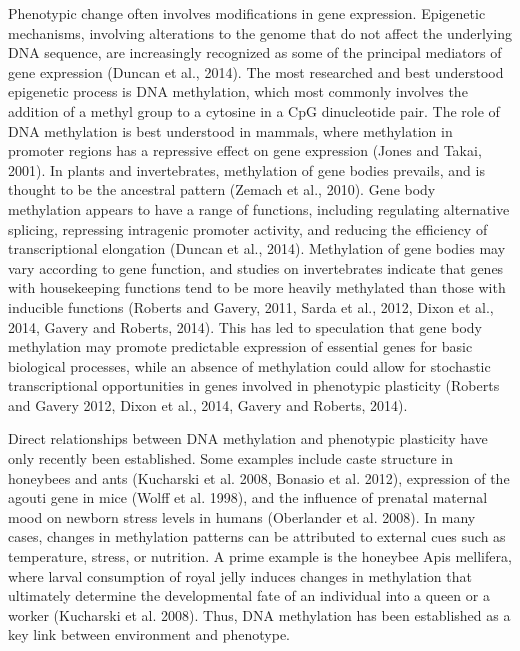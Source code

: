 Phenotypic change often involves modifications in gene expression. Epigenetic mechanisms, involving alterations to the genome that do not affect the underlying DNA sequence, are increasingly recognized as some of the principal mediators of gene expression (Duncan et al., 2014). The most researched and best understood epigenetic process is DNA methylation, which most commonly involves the addition of a methyl group to a cytosine in a CpG dinucleotide pair. The role of DNA methylation is best understood in mammals, where methylation in promoter regions has a repressive effect on gene expression (Jones and Takai, 2001). In plants and invertebrates, methylation of gene bodies prevails, and is thought to be the ancestral pattern (Zemach et al., 2010). Gene body methylation appears to have a range of functions, including regulating alternative splicing, repressing intragenic promoter activity, and reducing the efficiency of transcriptional elongation (Duncan et al., 2014). Methylation of gene bodies may vary according to gene function, and studies on invertebrates indicate that genes with housekeeping functions tend to be more heavily methylated than those with inducible functions (Roberts and Gavery, 2011, Sarda et al., 2012, Dixon et al., 2014, Gavery and Roberts, 2014). This has led to speculation that gene body methylation may promote predictable expression of essential genes for basic biological processes, while an absence of methylation could allow for stochastic transcriptional opportunities in genes involved in phenotypic plasticity (Roberts and Gavery 2012, Dixon et al., 2014, Gavery and Roberts, 2014).
 
Direct relationships between DNA methylation and phenotypic plasticity have only recently been established. Some examples include caste structure in honeybees and ants (Kucharski et al. 2008, Bonasio et al. 2012), expression of the agouti gene in mice (Wolff et al. 1998), and the influence of prenatal maternal mood on newborn stress levels in humans (Oberlander et al. 2008). In many cases, changes in methylation patterns can be attributed to external cues such as temperature, stress, or nutrition. A prime example is the honeybee Apis mellifera, where larval consumption of royal jelly induces changes in methylation that ultimately determine the developmental fate of an individual into a queen or a worker (Kucharski et al. 2008). Thus, DNA methylation has been established as a key link between environment and phenotype.

